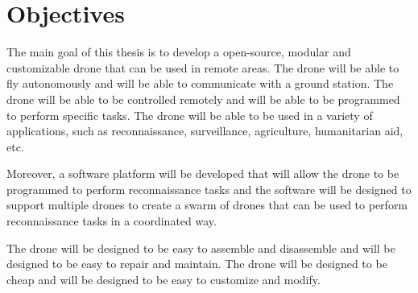 \chapter{Objectives}

The main goal of this thesis is to develop a open-source, modular and customizable drone that can be used in remote areas. The drone will be able to fly autonomously and will be able to communicate with a ground station. The drone will be able to be controlled remotely and will be able to be programmed to perform specific tasks. The drone will be able to be used in a variety of applications, such as reconnaissance, surveillance, agriculture, humanitarian aid, etc.

Moreover, a software platform will be developed that will allow the drone to be programmed to perform reconnaissance tasks and the software will be designed to support multiple drones to create a swarm of drones that can be used to perform reconnaissance tasks in a coordinated way.

The drone will be designed to be easy to assemble and disassemble and will be designed to be easy to repair and maintain. The drone will be designed to be cheap and will be designed to be easy to customize and modify.
